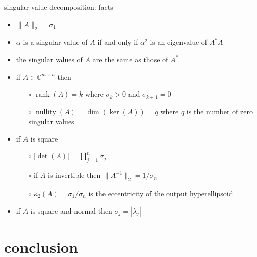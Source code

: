 \documentclass[10pt,hyperref]{beamer}
\newcommand{\CC}{\mathbb{C}}
\newcommand{\rank}{\operatorname{rank}}
\begin{document}
\begin{frame}{singular value decomposition: facts}

\begin{itemize}
\item $\|A\|_2=\sigma_1$
\item $\alpha$ is a singular value of $A$ if and only if $\alpha^2$ is an eigenvalue of $A^*A$
\item the singular values of $A$ are the same as those of $A^*$
\item if $A\in \CC^{m\times n}$ then
    \begin{itemize}
    \item[$\circ$] $\rank(A)=k$ where $\sigma_k>0$ and $\sigma_{k+1}=0$
    \item[$\circ$] $\operatorname{nullity}(A)=\dim(\ker(A))=q$ where $q$ is the number of zero singular values
    \end{itemize}
\item if $A$ is square
    \begin{itemize}
    \item[$\circ$] $|\det(A)| = \prod_{j=1}^n \sigma_j$
    \item[$\circ$] if $A$ is invertible then $\|A^{-1}\|_2 = 1/\sigma_n$
    \item[$\circ$] $\kappa_2(A) = \sigma_1/\sigma_n$ is the eccentricity of the output hyperellipsoid
    \end{itemize}
\item if $A$ is square and normal then $\sigma_j = |\lambda_j|$
\end{itemize}
\end{frame}


\section{conclusion}
\end{document}
